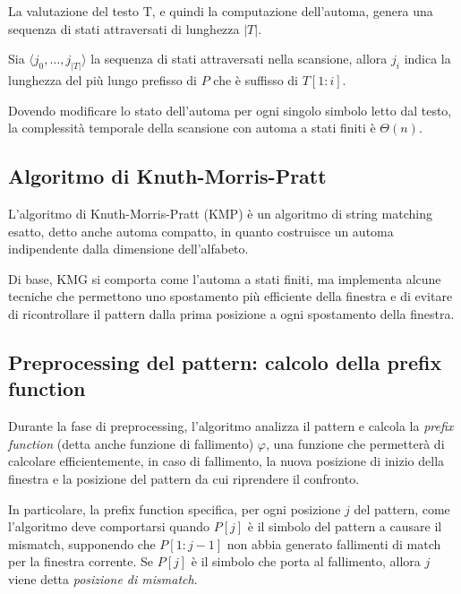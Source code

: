 La valutazione del testo T, e quindi la computazione dell'automa, genera una sequenza di stati attraversati di lunghezza $|T|$.

\begin{thm}
    Sia $\langle j_0, \ldots, j_{|T|} \rangle$ la sequenza di stati attraversati nella scansione, allora $j_i$ indica la lunghezza del più lungo prefisso di $P$ che è suffisso di $T[1:i]$.
\end{thm}
Dovendo modificare lo stato dell'automa per ogni singolo simbolo letto dal testo, la complessità temporale della scansione con automa a stati finiti è $\Theta(n)$.



\subsection*{Algoritmo di Knuth-Morris-Pratt}
L'algoritmo di Knuth-Morris-Pratt (KMP) è un algoritmo di string matching esatto, detto anche automa compatto, in quanto costruisce un automa indipendente dalla dimensione dell'alfabeto.

Di base, KMG si comporta come l'automa a stati finiti, ma implementa alcune tecniche che permettono uno spostamento più efficiente della finestra e di evitare di ricontrollare il pattern dalla prima posizione a ogni spostamento della finestra.

\subsection{Preprocessing del pattern: calcolo della prefix function}
Durante la fase di preprocessing, l'algoritmo analizza il pattern e calcola la \textit{prefix function} (detta anche funzione di fallimento) $\varphi$, una funzione che permetterà di calcolare efficientemente, in caso di fallimento, la nuova posizione di inizio della finestra e la posizione del pattern da cui riprendere il confronto.

In particolare, la prefix function specifica, per ogni posizione $j$ del pattern, come l'algoritmo deve comportarsi quando $P[j]$ è il simbolo del pattern a causare il mismatch, supponendo che $P[1:j-1]$ non abbia generato fallimenti di match per la finestra corrente.
Se $P[j]$ è il simbolo che porta al fallimento, allora $j$ viene detta \textit{posizione di mismatch}.

